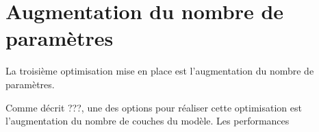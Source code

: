 \section{Augmentation du nombre de paramètres} \label{sec:layers}

La troisième optimisation mise en place est l'augmentation du nombre de paramètres.

Comme décrit ???, une des options pour réaliser cette optimisation est l'augmentation du nombre de couches du modèle.%
Les performances

